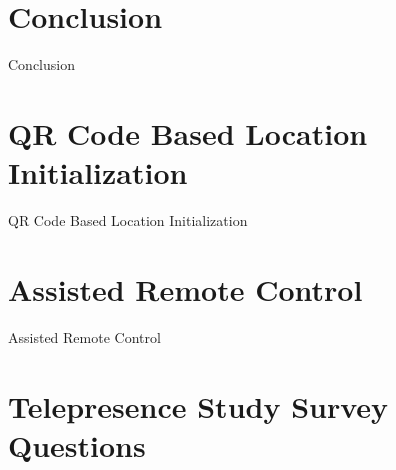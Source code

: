 \documentclass[12pt]{gatech-thesis}
\begin{document}







\chapter{Conclusion}
\label{chapter:conclusion}

Conclusion

\appendix
\chapter{QR Code Based Location Initialization}
\label{chapter:qr_code_based_location_initialization}

QR Code Based Location Initialization

\chapter{Assisted Remote Control}
\label{chapter:assisted_remote_control}

Assisted Remote Control

\chapter{Telepresence Study Survey Questions}
\label{chapter:telepresence_user_study_survey_questions}







\begin{postliminary}


\end{postliminary}

\end{document}
